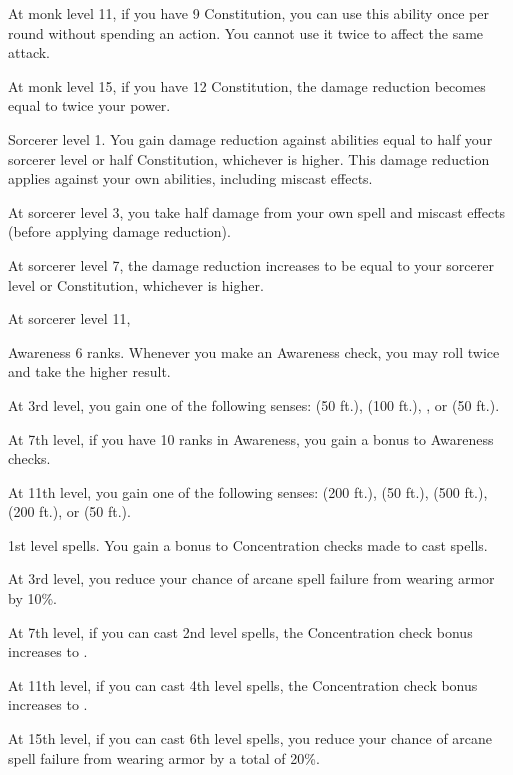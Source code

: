     At monk level 11, if you have 9 Constitution, you can use this ability once per round without spending an action.
    You cannot use it twice to affect the same attack.

    At monk level 15, if you have 12 Constitution, the damage reduction becomes equal to twice your \ki power.

    \featpre Sorcerer level 1.
    \featben You gain damage reduction against  abilities equal to half your sorcerer level or half Constitution, whichever is higher.
    This damage reduction applies against your own abilities, including miscast effects.

    At sorcerer level 3, you take half damage from your own spell and miscast effects (before applying damage reduction).

    At sorcerer level 7, the damage reduction increases to be equal to your sorcerer level or Constitution, whichever is higher.

    At sorcerer level 11, 

    \featpre Awareness 6 ranks.
    \featben Whenever you make an Awareness check, you may roll twice and take the higher result.

    At 3rd level, you gain one of the following senses:  (50 ft.),  (100 ft.), , or  (50 ft.).

    At 7th level, if you have 10 ranks in Awareness, you gain a  bonus to Awareness checks.

    At 11th level, you gain one of the following senses:  (200 ft.),  (50 ft.),  (500 ft.),  (200 ft.), or  (50 ft.).

    \featpre 1st level spells.
    \featben You gain a  bonus to Concentration checks made to cast spells.

    At 3rd level, you reduce your chance of arcane spell failure from wearing armor by 10\%.

    At 7th level, if you can cast 2nd level spells, the Concentration check bonus increases to .

    At 11th level, if you can cast 4th level spells, the Concentration check bonus increases to .

    At 15th level, if you can cast 6th level spells, you reduce your chance of arcane spell failure from wearing armor by a total of 20\%.


